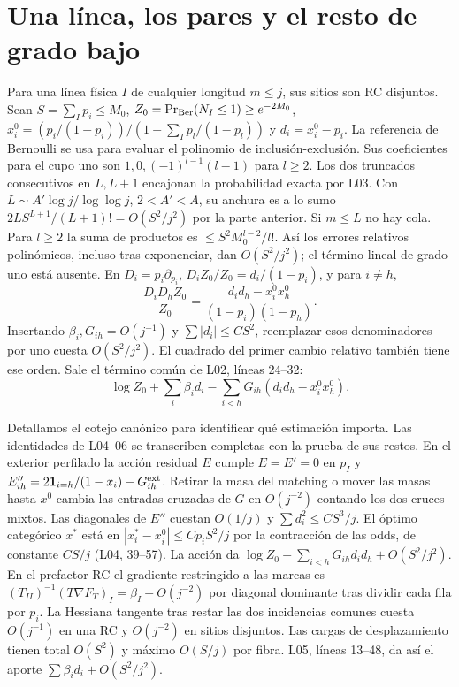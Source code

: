 \section{Una línea, los pares y el resto de grado bajo}
Para una línea física $I$ de cualquier longitud $m\le j$, sus sitios son RC disjuntos.
Sean $S=\sum_I p_i\le M_0$, $Z_0=\Pr_{\rm Ber}(N_I\le1)\ge e^{-2M_0}$,
$x_i^0=(p_i/(1-p_i))/(1+\sum_I p_l/(1-p_l))$ y $d_i=x_i^0-p_i$.
La referencia de Bernoulli se usa para evaluar el polinomio de inclusión-exclusión.
Sus coeficientes para el cupo uno son $1,0,(-1)^{l-1}(l-1)$ para $l\ge2$.
Los dos truncados consecutivos en $L,L+1$ encajonan la probabilidad exacta por L03.
Con $L\sim A'\log j/\log\log j$, $2<A'<A$, su anchura es a lo sumo
$2L S^{L+1}/(L+1)!=O(S^2/j^2)$ por la parte anterior.
Si $m\le L$ no hay cola. Para $l\ge2$ la suma de productos es
$\le S^2 M_0^{l-2}/l!$. Así los errores relativos polinómicos, incluso tras
exponenciar, dan $O(S^2/j^2)$; el término lineal de grado uno está ausente.
En $D_i=p_i\partial_{p_i}$, $D_i Z_0/Z_0=d_i/(1-p_i)$, y para $i\ne h$,
\[
 \frac{D_iD_h Z_0}{Z_0}=\frac{d_i d_h-x_i^0x_h^0}{(1-p_i)(1-p_h)} .
\]
Insertando $\beta_i,G_{ih}=O(j^{-1})$ y $\sum|d_i|\le CS^2$, reemplazar esos
denominadores por uno cuesta $O(S^2/j^2)$. El cuadrado del primer cambio relativo
también tiene ese orden. Sale el término común de L02, líneas 24--32:
\[
 \log Z_0+\sum_i\beta_i d_i-\sum_{i<h}G_{ih}(d_i d_h-x_i^0x_h^0).
\]

Detallamos el cotejo canónico para identificar qué estimación importa. Las identidades
de L04--06 se transcriben completas con la prueba de sus restos. En el exterior
perfilado la acción residual $E$ cumple $E=E'=0$ en $p_I$ y
$E''_{ih}=2{\bf1}_{i=h}/(1-x_i)-G^{\rm ext}_{ih}$.
Retirar la masa del matching o mover las masas hasta $x^0$ cambia las entradas
cruzadas de $G$ en $O(j^{-2})$ contando los dos cruces mixtos. Las diagonales
de $E''$ cuestan $O(1/j)$ y $\sum d_i^2\le CS^3/j$.
El óptimo categórico $x^*$ está en $|x_i^*-x_i^0|\le Cp_iS^2/j$
por la contracción de las odds, de constante $CS/j$ (L04, 39--57).
La acción da $\log Z_0-\sum_{i<h}G_{ih}d_id_h+O(S^2/j^2)$.
En el prefactor RC el gradiente restringido a las marcas es
$(T_{II})^{-1}(T\nabla F_T)_I=\beta_I+O(j^{-2})$ por diagonal dominante
tras dividir cada fila por $p_i$. La Hessiana tangente tras restar las dos
incidencias comunes cuesta $O(j^{-1})$ en una RC y $O(j^{-2})$ en sitios disjuntos.
Las cargas de desplazamiento tienen total $O(S^2)$ y máximo $O(S/j)$ por fibra.
L05, líneas 13--48, da así el aporte $\sum\beta_i d_i+O(S^2/j^2)$.


